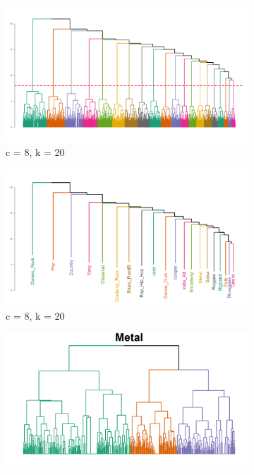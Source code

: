 \documentclass[a4paper,12pt]{extarticle}
\begin{document}
\begin{figure}[t!]
     \begin{subfigure}[b]{0.5\textwidth}
        \centering
        \includegraphics[width=1.0\textwidth]{Plots/Dend/macro.png}
        \caption{c = 8, k = 20}
        \label{fig:dend-macro}
    \end{subfigure} 
     \begin{subfigure}[b]{0.5\textwidth}
        \centering
        \includegraphics[width=1.0\textwidth]{Plots/Dend/macro-lab.png}
        \caption{c = 8, k = 20}
        \label{fig:dend-macro-labels}
    \end{subfigure} 
     \begin{subfigure}[b]{0.5\textwidth}
        \centering
        \includegraphics[width=1.0\textwidth]{Plots/Dend/metal-branches.png}

\end{subfigure}
\end{figure}
\end{document}
